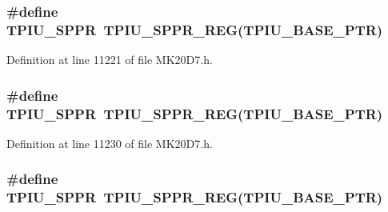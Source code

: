 \subsubsection[{\texorpdfstring{T\+P\+I\+U\+\_\+\+S\+P\+PR}{TPIU_SPPR}}]{\setlength{\rightskip}{0pt plus 5cm}\#define T\+P\+I\+U\+\_\+\+S\+P\+PR~{\bf T\+P\+I\+U\+\_\+\+S\+P\+P\+R\+\_\+\+R\+EG}({\bf T\+P\+I\+U\+\_\+\+B\+A\+S\+E\+\_\+\+P\+TR})}\hypertarget{group___t_p_i_u___register___accessor___macros_ga07413fb90b689fafae5fb669e7bfadd7}{}\label{group___t_p_i_u___register___accessor___macros_ga07413fb90b689fafae5fb669e7bfadd7}


Definition at line 11221 of file M\+K20\+D7.\+h.

\subsubsection[{\texorpdfstring{T\+P\+I\+U\+\_\+\+S\+P\+PR}{TPIU_SPPR}}]{\setlength{\rightskip}{0pt plus 5cm}\#define T\+P\+I\+U\+\_\+\+S\+P\+PR~{\bf T\+P\+I\+U\+\_\+\+S\+P\+P\+R\+\_\+\+R\+EG}({\bf T\+P\+I\+U\+\_\+\+B\+A\+S\+E\+\_\+\+P\+TR})}\hypertarget{group___t_p_i_u___register___accessor___macros_ga07413fb90b689fafae5fb669e7bfadd7}{}\label{group___t_p_i_u___register___accessor___macros_ga07413fb90b689fafae5fb669e7bfadd7}


Definition at line 11230 of file M\+K20\+D7.\+h.

\subsubsection[{\texorpdfstring{T\+P\+I\+U\+\_\+\+S\+P\+PR}{TPIU_SPPR}}]{\setlength{\rightskip}{0pt plus 5cm}\#define T\+P\+I\+U\+\_\+\+S\+P\+PR~{\bf T\+P\+I\+U\+\_\+\+S\+P\+P\+R\+\_\+\+R\+EG}({\bf T\+P\+I\+U\+\_\+\+B\+A\+S\+E\+\_\+\+P\+TR})}\hypertarget{group___t_p_i_u___register___accessor___macros_ga07413fb90b689fafae5fb669e7bfadd7}{}\label{group___t_p_i_u___register___accessor___macros_ga07413fb90b689fafae5fb669e7bfadd7}


